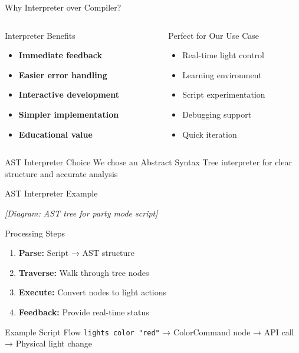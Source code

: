 \documentclass{beamer}
\begin{document}
\begin{frame}{Why Interpreter over Compiler?}
\begin{columns}
\begin{column}{0.5\textwidth}
\begin{block}{Interpreter Benefits}
\begin{itemize}
    \item \textbf{Immediate feedback}
    \item \textbf{Easier error handling}
    \item \textbf{Interactive development}
    \item \textbf{Simpler implementation}
    \item \textbf{Educational value}
\end{itemize}
\end{block}
\end{column}
\begin{column}{0.5\textwidth}
\begin{block}{Perfect for Our Use Case}
\begin{itemize}
    \item Real-time light control
    \item Learning environment
    \item Script experimentation
    \item Debugging support
    \item Quick iteration
\end{itemize}
\end{block}
\end{column}
\end{columns}

\begin{block}{AST Interpreter Choice}
We chose an Abstract Syntax Tree interpreter for clear structure and accurate analysis
\end{block}
\end{frame}

\begin{frame}{AST Interpreter Example}
\begin{center}
\textit{[Diagram: AST tree for party mode script]}
\end{center}

\begin{block}{Processing Steps}
\begin{enumerate}
    \item \textbf{Parse:} Script → AST structure
    \item \textbf{Traverse:} Walk through tree nodes
    \item \textbf{Execute:} Convert nodes to light actions
    \item \textbf{Feedback:} Provide real-time status
\end{enumerate}
\end{block}

\begin{block}{Example Script Flow}
\texttt{lights color "red"} → ColorCommand node → API call → Physical light change
\end{block}
\end{frame}
\end{document}
